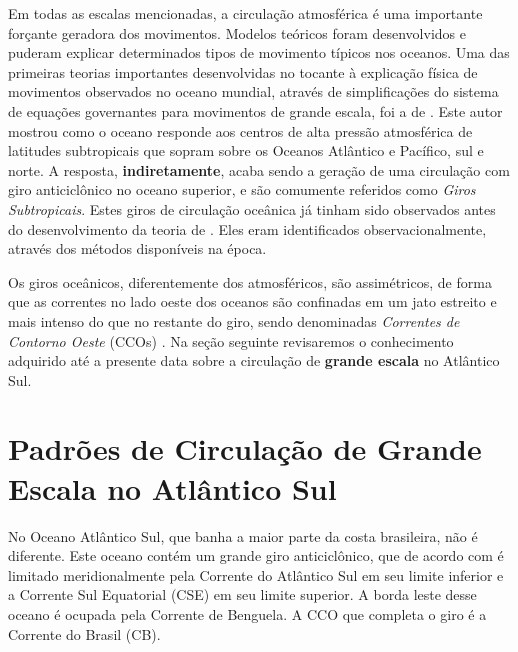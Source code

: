 
Em todas as escalas mencionadas, a circulação atmosférica é uma importante for\-çan\-te
geradora dos movimentos.  Modelos teóricos foram desenvolvidos e puderam 
explicar determinados tipos de movimento típicos nos oceanos. Uma das primeiras teorias importantes
desenvolvidas no tocante à explicação física de movimentos observados no oceano mundial,
 através de simplificações do sistema de equações governantes para movimentos de grande escala, foi a 
de \cite{sverdrup1947}. Este autor mostrou como o oceano responde aos centros de alta pressão atmosférica 
de latitudes subtropicais 
que sopram sobre os Oceanos Atlântico e Pacífico, sul e norte. A resposta, {\bf indiretamente},
acaba sendo a geração de uma circulação com giro anticiclônico no oceano superior,
e são comumente referidos como {\it Giros Subtropicais}. Estes giros de circulação oceânica já tinham sido 
observados antes do desenvolvimento da teoria de \cite{sverdrup1947}. Eles eram identificados
observacionalmente, através dos métodos disponíveis na época. 

Os giros oceânicos, diferentemente dos atmosféricos, são assimétricos, de forma
que as correntes no lado oeste dos oceanos são confinadas em um jato estreito
e mais intenso do que no restante do giro, sendo denominadas {\it Correntes de Contorno
Oeste} (CCOs) \citep{stommel1948,munk1950}. Na seção seguinte revisaremos o conhecimento adquirido até a presente data
sobre a circulação de {\bf grande escala} no Atlântico Sul.

\section{Padrões de Circulação de Grande Escala no Atlântico Sul}\label{sec:largesc}

\hspace{6mm} No Oceano Atlântico Sul, que banha a maior parte da costa brasileira, não é diferente. 
Este oceano contém um grande 
giro anticiclônico, que de acordo com \cite{stramma_england1999} é limitado meridionalmente pela Corrente do Atlântico Sul em 
seu limite inferior e a Corrente Sul Equatorial (CSE) em seu limite superior. A borda leste
desse oceano é ocupada pela Corrente de Benguela. A CCO
que completa o giro é a Corrente do Brasil (CB).

